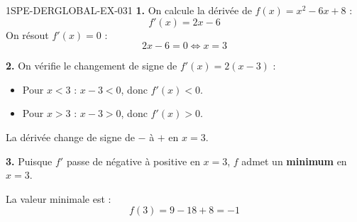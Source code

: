 \begin{corrige}{1SPE-DERGLOBAL-EX-031}
\textbf{1.} On calcule la dérivée de $f(x) = x^2 - 6x + 8$ :
\[
f'(x) = 2x - 6
\]
On résout $f'(x) = 0$ :
\[
2x - 6 = 0 \iff x = 3
\]

\textbf{2.} On vérifie le changement de signe de $f'(x) = 2(x - 3)$ :
\begin{itemize}
\item Pour $x < 3$ : $x - 3 < 0$, donc $f'(x) < 0$.
\item Pour $x > 3$ : $x - 3 > 0$, donc $f'(x) > 0$.
\end{itemize}
La dérivée change de signe de $-$ à $+$ en $x = 3$.

\textbf{3.} Puisque $f'$ passe de négative à positive en $x = 3$, $f$ admet un \textbf{minimum} en $x = 3$.

La valeur minimale est :
\[
f(3) = 9 - 18 + 8 = \boxed{-1}
\]
\end{corrige}
